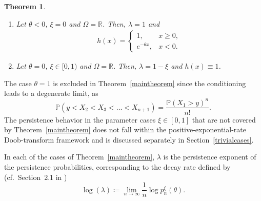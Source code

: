 \documentclass[10pt,a4paper]{amsart}
\newcommand{\R}{\mathbb{R}} %
\renewcommand{\P}{\mathbb{P}} %
\newcommand{\1}{\mathds{1}}
\newtheorem{Theorem}[definition]{Theorem}
\begin{document}
\begin{Theorem}
\begin{enumerate}[label=(\roman*)]
\begin{align*}
\begin{cases}
        \end{cases}
 \end{align*}
 \item Let $\theta <0$, $\xi=0$ and $\Omega=\R$. Then, $\lambda=1$ and \begin{align} \label{eqn:lasth}
    h(x)=\begin{cases}
        1,~~&x\ge 0,
        \\ e^{-\theta x},&x<0.
    \end{cases}
\end{align}
 \item Let $\theta=0$, $\xi\in[0,1)$ and $\Omega=\R$. Then, $\lambda=1-\xi$ and $h(x)\equiv 1$.
\end{enumerate}
\end{Theorem}

    The case $\theta=1$ is excluded in Theorem~\ref{maintheorem} since the conditioning leads to a degenerate limit, as $$\P(y<X_2<X_3<\dots<X_{n+1})=\frac{\P(X_1>y)^n}{n!}.$$  
    The persistence behavior in the parameter cases $\xi\in[0,1]$
    that are not covered by Theorem~\ref{maintheorem} does not fall within the positive-exponential-rate Doob-transform framework and is discussed separately in Section~\ref{trivialcases}.

    In each of the cases of Theorem~\ref{maintheorem}, $\lambda$ is  
    the persistence exponent of the persistence probabilities, corresponding to the decay rate defined by (cf.\ Section~2.1 in \cite{AMZ})
    $$
    \log(\lambda)\coloneqq\lim_{n\to\infty}\frac{1}{n}\log p_n^\xi(\theta).
    $$
\end{document}
